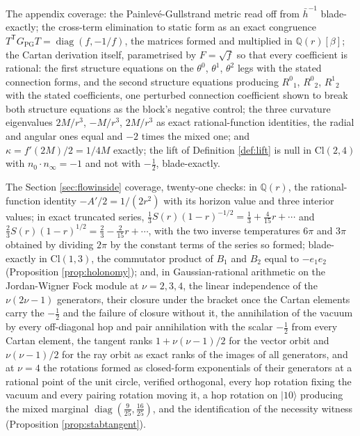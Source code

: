 \documentclass[11pt]{article}
\theoremstyle{definition}
\newcommand{\Cl}{\mathrm{Cl}}
\newcommand{\hb}{\bar{h}}
\newcommand{\nO}{n_0}
\newcommand{\nInf}{n_\infty}
\begin{document}
The appendix coverage: the Painlev\'e-Gullstrand metric read off from $\hb^{-1}$ blade-exactly; the cross-term elimination to static form as an exact congruence $T^{\mathsf T}G_{\mathrm{PG}}T = \operatorname{diag}(f, -1/f)$, the matrices formed and multiplied in $\mathbb{Q}(r)[\beta]$; the Cartan derivation itself, parametrised by $F = \sqrt f$ so that every coefficient is rational: the first structure equations on the $\theta^{0}$, $\theta^{1}$, $\theta^{2}$ legs with the stated connection forms, and the second structure equations producing $R^{0}{}_{1}$, $R^{0}{}_{2}$, $R^{1}{}_{2}$ with the stated coefficients, one perturbed connection coefficient shown to break both structure equations as the block's negative control; the three curvature eigenvalues $2M/r^3$, $-M/r^3$, $2M/r^3$ as exact rational-function identities, the radial and angular ones equal and $-2$ times the mixed one; and $\kappa = f'(2M)/2 = 1/4M$ exactly; the lift of Definition \ref{def:lift} is null in $\Cl(2,4)$ with $\nO \cdot \nInf = -1$ and not with $-\tfrac12$, blade-exactly.

The Section \ref{sec:flowinside} coverage, twenty-one checks: in $\mathbb{Q}(r)$, the rational-function identity $-A'/2 = 1/(2r^2)$ with its horizon value and three interior values; in exact truncated series, $\tfrac13 S(r)(1 - r)^{-1/2} = \tfrac13 + \tfrac{4}{15}r + \cdots$ and $\tfrac23 S(r)(1 - r)^{1/2} = \tfrac23 - \tfrac{2}{15}r + \cdots$, with the two inverse temperatures $6\pi$ and $3\pi$ obtained by dividing $2\pi$ by the constant terms of the series so formed; blade-exactly in $\Cl(1,3)$, the commutator product of $B_1$ and $B_2$ equal to $-e_1 e_2$ (Proposition \ref{prop:holonomy}); and, in Gaussian-rational arithmetic on the Jordan-Wigner Fock module at $\nu = 2, 3, 4$, the linear independence of the $\nu(2\nu - 1)$ generators, their closure under the bracket once the Cartan elements carry the $-\tfrac12$ and the failure of closure without it, the annihilation of the vacuum by every off-diagonal hop and pair annihilation with the scalar $-\tfrac12$ from every Cartan element, the tangent ranks $1 + \nu(\nu - 1)/2$ for the vector orbit and $\nu(\nu - 1)/2$ for the ray orbit as exact ranks of the images of all generators, and at $\nu = 4$ the rotations formed as closed-form exponentials of their generators at a rational point of the unit circle, verified orthogonal, every hop rotation fixing the vacuum and every pairing rotation moving it, a hop rotation on $|10\rangle$ producing the mixed marginal $\operatorname{diag}(\tfrac{9}{25}, \tfrac{16}{25})$, and the identification of the necessity witness (Proposition \ref{prop:stabtangent}).
\end{document}
